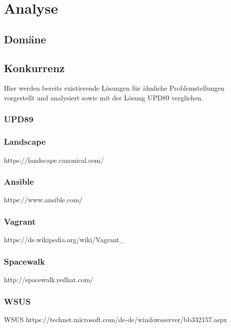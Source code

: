 \chapter{Analyse}

\section{Domäne}

\section{Konkurrenz} \label{sec:analysis:competition}

Hier werden bereits existierende Lösungen für ähnliche Problemstellungen vorgestellt und analysiert sowie mit der Lösung \gls{UPD89} verglichen.

\subsection{UPD89}


\subsection{Landscape}
https://landscape.canonical.com/

\subsection{Ansible}
https://www.ansible.com/

\subsection{Vagrant}
https://de.wikipedia.org/wiki/Vagrant_%

\subsection{Spacewalk}
http://spacewalk.redhat.com/

\subsection{WSUS}
\gls{WSUS}
https://technet.microsoft.com/de-de/windowsserver/bb332157.aspx
